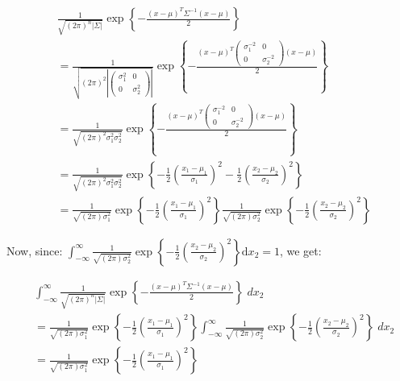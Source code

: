 {\begin{align*}
& \frac{1}{\sqrt{\left(2\pi\right)^{n}\left|\Sigma\right|}}\exp\left\{ -\frac{\left(x-\mu\right)^{T}\Sigma^{-1}\left(x-\mu\right)}{2}\right\} \\ &= \frac{1}{\sqrt{\left(2\pi\right)^{2}\left|\left(\begin{array}{cc}
\sigma_{1}^{2} & 0\\
0 & \sigma_{2}^{2}
\end{array}\right)\right|}}\exp\left\{ -\frac{\left(x-\mu\right)^{T}\left(\begin{array}{cc}
\sigma_{1}^{-2} & 0\\
0 & \sigma_{2}^{-2}
\end{array}\right)\left(x-\mu\right)}{2}\right\}\\&
= \frac{1}{\sqrt{\left(2\pi\right)^{2}\sigma_{1}^{2}\sigma_{2}^{2}}}\exp\left\{ -\frac{\left(x-\mu\right)^{T}\left(\begin{array}{cc}
\sigma_{1}^{-2} & 0\\
0 & \sigma_{2}^{-2}
\end{array}\right)\left(x-\mu\right)}{2}\right\} \\&
= \frac{1}{\sqrt{\left(2\pi\right)^{2}\sigma_{1}^{2}\sigma_{2}^{2}}}\exp\left\{ -\frac{1}{2} \left(\frac{x_{1}-\mu_{1}}{\sigma_{1}}\right)^{2} - \frac{1}{2} \left(\frac{x_{2} - \mu_{2}}{\sigma_{2}}\right)^{2}\right\} \\&
=	\frac{1}{\sqrt{\left(2\pi\right)\sigma_{1}^{2}}}\exp\left\{ -\frac{1}{2} \left(\frac{x_{1}-\mu_{1}}{\sigma_{1}}\right)^{2}\right\} \frac{1}{\sqrt{\left(2\pi\right)\sigma_{2}^{2}}}\exp\left\{ -\frac{1}{2} \left(\frac{x_{2}-\mu_{2}}{\sigma_{2}}\right)^{2}\right\}
\end{align*}

Now, since: $\int_{-\infty}^\infty\frac{1}{\sqrt{\left(2\pi\right)\sigma_{2}^{2}}}\exp\left\{ -\frac{1}{2} \left(\frac{x_{2}-\mu_{2}}{\sigma_{2}}\right)^{2}\right\}
\mathrm{d}x_2=1$, we get:

\begin{align*}
&\int_{-\infty}^\infty\frac{1}{\sqrt{\left(2\pi\right)^{n}\left|\Sigma\right|}}\exp\left\{ -\frac{\left(x-\mu\right)^{T}\Sigma^{-1}\left(x-\mu\right)}{2}\right\}\;dx_2 \\ &=\frac{1}{\sqrt{\left(2\pi\right)\sigma_{1}^{2}}}\exp\left\{ -\frac{1}{2} \left(\frac{x_{1}-\mu_{1}}{\sigma_{1}}\right)^{2}\right\}
\int_{-\infty}^\infty\frac{1}{\sqrt{\left(2\pi\right)\sigma_{2}^{2}}}\exp\left\{ -\frac{1}{2} \left(\frac{x_{2}-\mu_{2}}{\sigma_{2}}\right)^{2}\right\}\;dx_2 \\
&=\frac{1}{\sqrt{\left(2\pi\right)\sigma_{1}^{2}}}\exp\left\{ -\frac{1}{2} \left(\frac{x_{1}-\mu_{1}}{\sigma_{1}}\right)^{2}\right\}
\end{align*}

}

